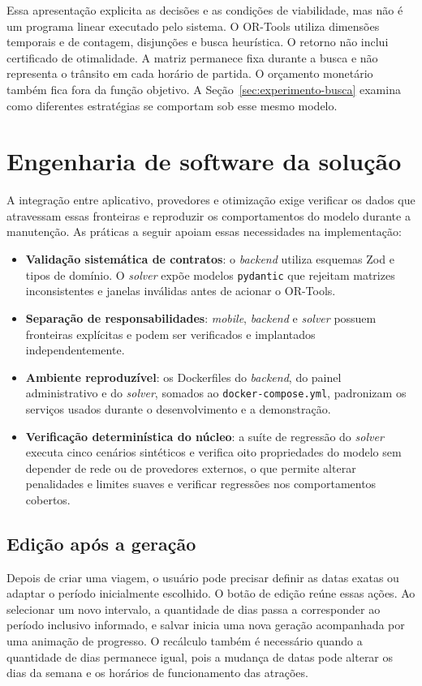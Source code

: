 Essa apresentação explicita as decisões e as condições de viabilidade, mas não é um programa linear executado pelo sistema. O OR-Tools utiliza dimensões temporais e de contagem, disjunções e busca heurística. O retorno não inclui certificado de otimalidade. A matriz permanece fixa durante a busca e não representa o trânsito em cada horário de partida. O orçamento monetário também fica fora da função objetivo. A Seção~\ref{sec:experimento-busca} examina como diferentes estratégias se comportam sob esse mesmo modelo.

\section{Engenharia de software da solução}

A integração entre aplicativo, provedores e otimização exige verificar os dados que atravessam essas fronteiras e reproduzir os comportamentos do modelo durante a manutenção. As práticas a seguir apoiam essas necessidades na implementação:
\begin{itemize}
  \item \textbf{Validação sistemática de contratos}: o \textit{backend} utiliza esquemas Zod e tipos de domínio. O \textit{solver} expõe modelos \texttt{pydantic} que rejeitam matrizes inconsistentes e janelas inválidas antes de acionar o OR-Tools.
  \item \textbf{Separação de responsabilidades}: \textit{mobile}, \textit{backend} e \textit{solver} possuem fronteiras explícitas e podem ser verificados e implantados independentemente.
  \item \textbf{Ambiente reproduzível}: os Dockerfiles do \textit{backend}, do painel administrativo e do \textit{solver}, somados ao \texttt{docker-compose.yml}, padronizam os serviços usados durante o desenvolvimento e a demonstração.
  \item \textbf{Verificação determinística do núcleo}: a suíte de regressão do \textit{solver} executa cinco cenários sintéticos e verifica oito propriedades do modelo sem depender de rede ou de provedores externos, o que permite alterar penalidades e limites suaves e verificar regressões nos comportamentos cobertos.
\end{itemize}

\subsection{Edição após a geração}

Depois de criar uma viagem, o usuário pode precisar definir as datas exatas ou adaptar o período inicialmente escolhido. O botão de edição reúne essas ações. Ao selecionar um novo intervalo, a quantidade de dias passa a corresponder ao período inclusivo informado, e salvar inicia uma nova geração acompanhada por uma animação de progresso. O recálculo também é necessário quando a quantidade de dias permanece igual, pois a mudança de datas pode alterar os dias da semana e os horários de funcionamento das atrações.

